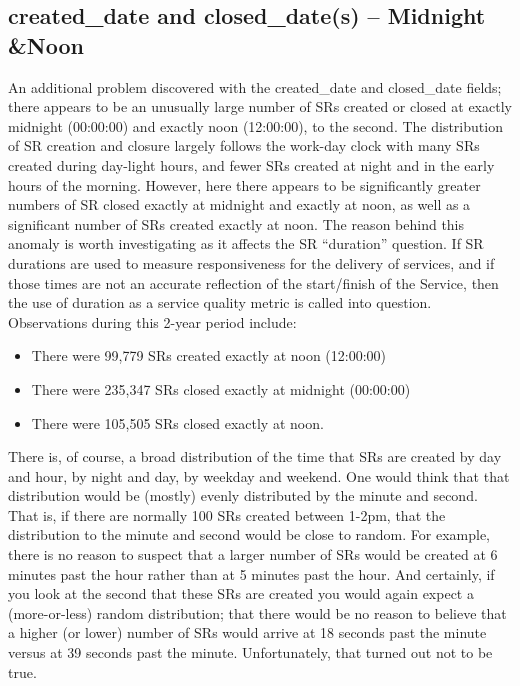 \documentclass[12pt, titlepage]{article}
\begin{document}
{	\subsection{created\_date and closed\_date(s) -- Midnight \&Noon}
	An additional problem discovered with the created\_date and 
	closed\_date fields; there appears to be an unusually large number of SRs 
	created or closed at exactly midnight (00:00:00) and exactly noon (12:00:00), 
	to the second. The distribution of SR creation and closure largely follows the 
	work-day clock with many SRs created during day-light hours, and 
	fewer SRs 	created at night and in the early hours of the morning. However, 
	here there appears to be significantly greater numbers of SR closed exactly 
	at midnight and exactly at noon, as well as a significant number of SRs 
	created exactly at noon. The reason behind this anomaly is worth investigating as 
	it affects the SR ``duration'' question. If SR durations are used to measure 
	responsiveness for the delivery of services, and if those times are not an 
	accurate reflection of the start/finish of the Service, then the use of duration 
	as a service quality metric is called into question. Observations during 
	this 2-year period include:
	
	\begin{itemize}
		    \item There were 99,779 SRs created exactly at noon (12:00:00)
		    \item There were 235,347 SRs closed exactly at midnight (00:00:00)
		    \item There were 105,505 SRs closed exactly at noon. 
	\end{itemize}
	
	There is, of course, a broad distribution of the time that SRs are 
	created by day and hour, by night and day, by weekday and weekend.  
	One would think that that distribution would be (mostly) evenly distributed 
	by the minute and second. That is, if there are normally 100 SRs created 
	between 1-2pm, that the distribution to the minute and second would be 
	close to random. For example, there is no reason to suspect that a larger 
	number of SRs would be created at 6 minutes past the hour rather 
	than at 5 minutes past the hour. And certainly, if you look at the second 
	that these SRs are created you would again expect a (more-or-less) 
	random distribution; that there would be no reason to believe that a higher 
	(or lower) number of SRs would arrive at 18 seconds past the minute 
	versus at 39 seconds past the minute. Unfortunately, that turned out not to be true.
	
}
\end{document}

